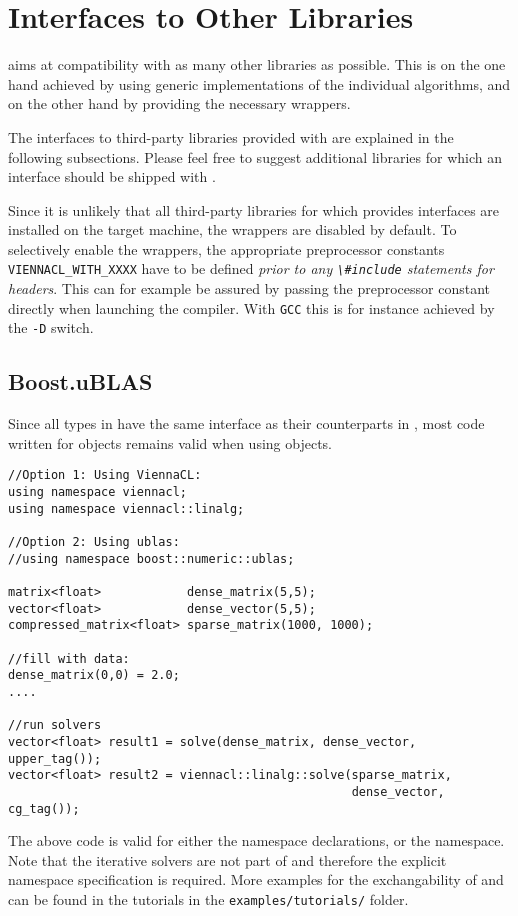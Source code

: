 \chapter{Interfaces to Other Libraries} \label{chap:other-libs}
{\ViennaCL} aims at compatibility with as many other libraries as possible.
This is on the one hand achieved by using generic implementations of the individual algorithms,
and on the other hand by providing the necessary wrappers.

The interfaces to third-party libraries provided with {\ViennaCL} are explained in the following subsections.
Please feel free to suggest additional libraries for which an interface should be shipped with {\ViennaCL}.

Since it is unlikely that all third-party libraries for which {\ViennaCL} provides interfaces are installed
on the target machine, the wrappers are disabled by default. To selectively enable the wrappers,
the appropriate preprocessor constants \lstinline|VIENNACL_WITH_XXXX| have to be defined \emph{prior to any
\lstinline|\#include| statements for {\ViennaCL} headers}. This can for example be assured by passing the
preprocessor constant directly when launching the compiler. With \lstinline|GCC| this is for instance
achieved by the \lstinline|-D| switch.

\section{Boost.uBLAS}
Since all types in {\ViennaCL} have the same interface as their counterparts in {\ublas},
most code written for {\ViennaCL} objects remains valid when using {\ublas} objects.
\begin{lstlisting}
//Option 1: Using ViennaCL:
using namespace viennacl;
using namespace viennacl::linalg;

//Option 2: Using ublas:
//using namespace boost::numeric::ublas;

matrix<float>            dense_matrix(5,5);
vector<float>            dense_vector(5,5);
compressed_matrix<float> sparse_matrix(1000, 1000);

//fill with data:
dense_matrix(0,0) = 2.0;
....

//run solvers
vector<float> result1 = solve(dense_matrix, dense_vector, upper_tag());
vector<float> result2 = viennacl::linalg::solve(sparse_matrix,
                                                dense_vector, cg_tag());
\end{lstlisting}
The above code is valid for either the {\ViennaCL} namespace declarations, or the {\ublas} namespace. Note that the
iterative solvers are not part of {\ublas} and therefore the explicit namespace specification is required. More examples
for the exchangability of {\ublas} and {\ViennaCL} can be found in the tutorials in the \texttt{examples/tutorials/} folder.


